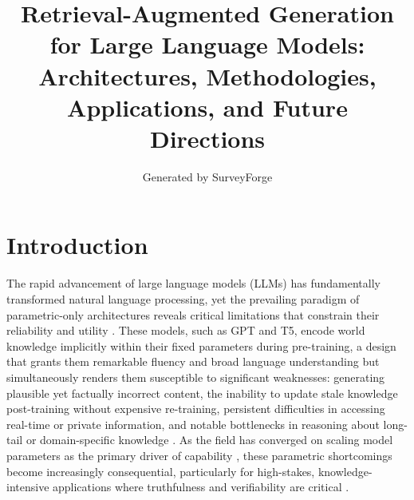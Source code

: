 \documentclass[11pt,a4paper]{article}
\title{Retrieval-Augmented Generation for Large Language Models: Architectures, Methodologies, Applications, and Future Directions}
\author{Generated by SurveyForge}
\date{}
\begin{document}
\maketitle
\tableofcontents
\newpage



\section{Introduction}


The rapid advancement of large language models (LLMs) has fundamentally transformed natural language processing, yet the prevailing paradigm of parametric-only architectures reveals critical limitations that constrain their reliability and utility \cite{arxiv:2402.06196v2,arxiv:2310.12321v1}. These models, such as GPT and T5, encode world knowledge implicitly within their fixed parameters during pre-training, a design that grants them remarkable fluency and broad language understanding but simultaneously renders them susceptible to significant weaknesses: generating plausible yet factually incorrect content, the inability to update stale knowledge post-training without expensive re-training, persistent difficulties in accessing real-time or private information, and notable bottlenecks in reasoning about long-tail or domain-specific knowledge \cite{arxiv:2312.05934v3,arxiv:2212.10511v4}. As the field has converged on scaling model parameters as the primary driver of capability \cite{arxiv:2307.10169v1}, these parametric shortcomings become increasingly consequential, particularly for high-stakes, knowledge-intensive applications where truthfulness and verifiability are critical \cite{arxiv:2305.14627v2,arxiv:2404.15939v2}.
\end{document}
